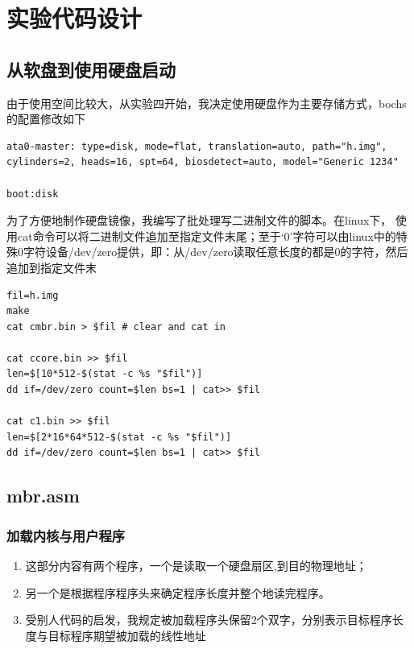 \documentclass[a4paper,11pt,UTF8]{ctexart}
\begin{document}
	

\section{实验代码设计}
	\subsection{从软盘到使用硬盘启动}
	由于使用空间比较大，从实验四开始，我决定使用硬盘作为主要存储方式，bochs的配置修改如下
	\begin{lstlisting}[caption={bochs硬盘配置参数},tabsize=4,basicstyle=\footnotesize,captionpos=b]
ata0-master: type=disk, mode=flat, translation=auto, path="h.img", cylinders=2, heads=16, spt=64, biosdetect=auto, model="Generic 1234"

boot:disk	
	\end{lstlisting}

	为了方便地制作硬盘镜像，我编写了批处理写二进制文件的脚本。在linux下， 使用cat命令可以将二进制文件追加至指定文件末尾；至于‘0’字符可以由linux中的特殊0字符设备/dev/zero提供，即：从/dev/zero读取任意长度的都是0的字符，然后追加到指定文件末
	\begin{lstlisting}[caption={make diskimg.sh},tabsize=4,basicstyle=\footnotesize,captionpos=b]
fil=h.img
make
cat cmbr.bin > $fil # clear and cat in

cat ccore.bin >> $fil
len=$[10*512-$(stat -c %s "$fil")]
dd if=/dev/zero count=$len bs=1 | cat>> $fil

cat c1.bin >> $fil
len=$[2*16*64*512-$(stat -c %s "$fil")]
dd if=/dev/zero count=$len bs=1 | cat>> $fil
	\end{lstlisting}

	\subsection{mbr.asm}
		\subsubsection{加载内核与用户程序}
			\begin{enumerate}
				\item 这部分内容有两个程序，一个是读取一个硬盘扇区,到目的物理地址；
				\item 另一个是根据程序程序头来确定程序长度并整个地读完程序。
				\item 受别人代码的启发，我规定被加载程序头保留2个双字，分别表示目标程序长度与目标程序期望被加载的线性地址
			\end{enumerate}
\end{document}

